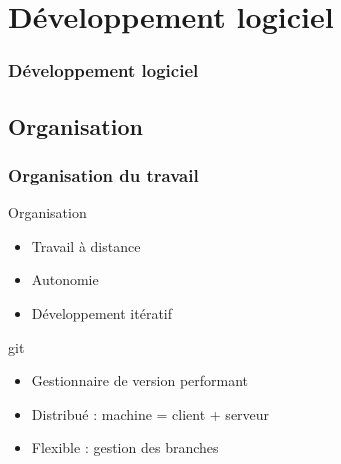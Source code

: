 \section{D\'eveloppement logiciel}

\begin{frame}
 	\frametitle{Développement logiciel}
\end{frame}

\subsection{Organisation}
\frame
{
\frametitle{Organisation du travail}
\begin{block}{Organisation}
 \begin{itemize}
 \item Travail à distance
 \item Autonomie
 \item Développement itératif
 \end{itemize}
\end{block}

\begin{block}{git}
\begin{itemize}
\item Gestionnaire de version performant
\item Distribué : machine = client + serveur
\item Flexible : gestion des branches
\end{itemize}
\end{block}

}

